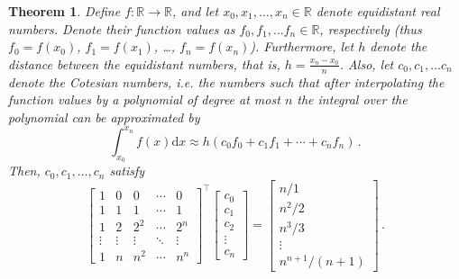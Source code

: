 \documentclass{article}
\newtheorem{theorem}{Theorem}
\begin{document}
\begin{theorem}
\label{theorem:mat}
Define $f: \mathbb R \to \mathbb R$, and let $x_0, x_1, \dots, x_n \in \mathbb R$ denote equidistant real numbers.
Denote their function values as $f_0, f_1, \dots f_n \in \mathbb R$, respectively (thus $f_0=f(x_0)$, $f_1=f(x_1)$, \dots, $f_n = f(x_n)$).
Furthermore, let $h$ denote the distance between the equidistant numbers, that is, $h=\frac{x_n-x_0}{n}$.
Also, let $c_0, c_1, \dots c_n$ denote the Cotesian numbers, i.e. the numbers such that after interpolating the function values by a polynomial of degree at most $n$ the integral over the polynomial can be approximated by
\begin{equation}
    \int_{x_0}^{x_n} f(x) \mathrm dx \approx h(c_0 f_0 + c_1f_1 + \cdots + c_nf_n) \,. \nonumber
\end{equation}
Then, $c_0, c_1, \dots, c_n$ satisfy
\begin{equation}
    \begin{bmatrix}
        1&0&0&\cdots&0 \\
        1&1&1&\cdots&1 \\
        1&2&2^2&\cdots&2^n \\
        \vdots&\vdots & \vdots & \ddots & \vdots\\
        1&n&n^2&\cdots&n^n
    \end{bmatrix}^\top
    \begin{bmatrix}
        c_0\\
        c_1\\
        c_2\\
        \vdots \\
        c_n
    \end{bmatrix}
    =
    \begin{bmatrix}
        n/1 \\
        n^2/2 \\
        n^3/3 \\
        \vdots \\
        n^{n+1}/(n+1)
    \end{bmatrix} \,.\nonumber
\end{equation}
\end{theorem}
\end{document}
